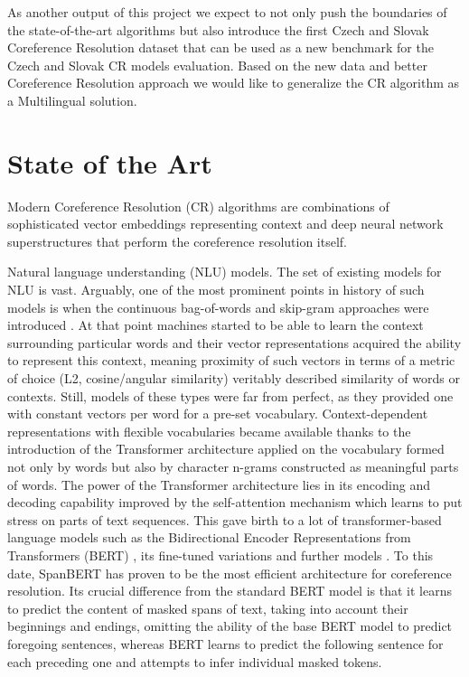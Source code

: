 As another output of this project we expect to not only push the boundaries of the state-of-the-art algorithms but also introduce the first Czech and Slovak Coreference Resolution dataset that can be used as a new benchmark for the Czech and Slovak CR models evaluation. Based on the new data and better Coreference Resolution approach  we would like to generalize the CR algorithm as a Multilingual solution.


\section{State of the Art}\label{sec:sota}

Modern Coreference Resolution (CR) algorithms are combinations of sophisticated vector embeddings representing context and deep neural network superstructures that perform the coreference resolution itself. 

Natural language understanding (NLU) models. 
The set of existing models for NLU is vast. 
Arguably, one of the most prominent points in history of such models is when the continuous bag-of-words and skip-gram approaches were introduced \cite{w2v-Mikolov2013}. 
At that point machines started to be able to learn the context surrounding particular words and their vector representations  acquired the ability to represent this context, meaning proximity of such vectors in terms of a metric of choice (L2, cosine/angular similarity) veritably described similarity of words or contexts. 
Still, models of these types were far from perfect, as they provided one with constant vectors per word for a pre-set vocabulary. 
Context-dependent representations with flexible vocabularies became available thanks to the introduction of the Transformer architecture \cite{transformer-Vaswani2017} applied on the vocabulary formed not only by words but also by character n-grams constructed as meaningful parts of words.  
The power of the Transformer architecture lies in its encoding and decoding capability improved by the self-attention mechanism which learns to put stress on parts of text sequences. 
This gave birth to a lot of transformer-based language models such as the Bidirectional Encoder Representations from Transformers (BERT) \cite{bert-Devlin2019}, its fine-tuned variations \cite{albert-Lan2020,robarta-Liu2019} and further models \cite{gpt-Radford2018,use-Cer2018}. 
To this date, SpanBERT \cite{cr-Joshi2019} has proven to be the most efficient architecture for coreference resolution. 
Its crucial difference from the standard BERT model is that it learns to predict the content of masked spans of text, taking into account their beginnings and endings, omitting the ability of the base BERT model to predict foregoing  sentences, whereas BERT learns to predict the following sentence for each preceding one and attempts to infer individual masked tokens. 


